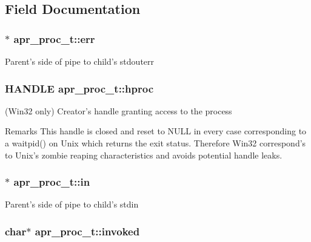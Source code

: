 \subsection{Field Documentation}
\hypertarget{structapr__proc__t_ad087f812b5c69ce937db4cf6e8cd5a0b}{
\subsubsection[{err}]{$\ast$ apr\-\_\-proc\-\_\-t\-::err}}\label{structapr__proc__t_ad087f812b5c69ce937db4cf6e8cd5a0b}
Parent's side of pipe to child's stdouterr \hypertarget{structapr__proc__t_aa1f17cce2b442d92893b9c63053b6771}{
\subsubsection[{hproc}]{\setlength{\rightskip}{0pt plus 5cm}H\-A\-N\-D\-L\-E apr\-\_\-proc\-\_\-t\-::hproc}}\label{structapr__proc__t_aa1f17cce2b442d92893b9c63053b6771}
(Win32 only) Creator's handle granting access to the process \begin{DoxyRemark}{Remarks}
This handle is closed and reset to N\-U\-L\-L in every case corresponding to a waitpid() on Unix which returns the exit status. Therefore Win32 correspond's to Unix's zombie reaping characteristics and avoids potential handle leaks. 
\end{DoxyRemark}
\hypertarget{structapr__proc__t_a914bda8939f9d17c9e2f238683fb994b}{
\subsubsection[{in}]{$\ast$ apr\-\_\-proc\-\_\-t\-::in}}\label{structapr__proc__t_a914bda8939f9d17c9e2f238683fb994b}
Parent's side of pipe to child's stdin \hypertarget{structapr__proc__t_a72ed1c58c3f08ffa7202fa80e870cd54}{
\subsubsection[{invoked}]{\setlength{\rightskip}{0pt plus 5cm}char$\ast$ apr\-\_\-proc\-\_\-t\-::invoked}}\label{structapr__proc__t_a72ed1c58c3f08ffa7202fa80e870cd54}
